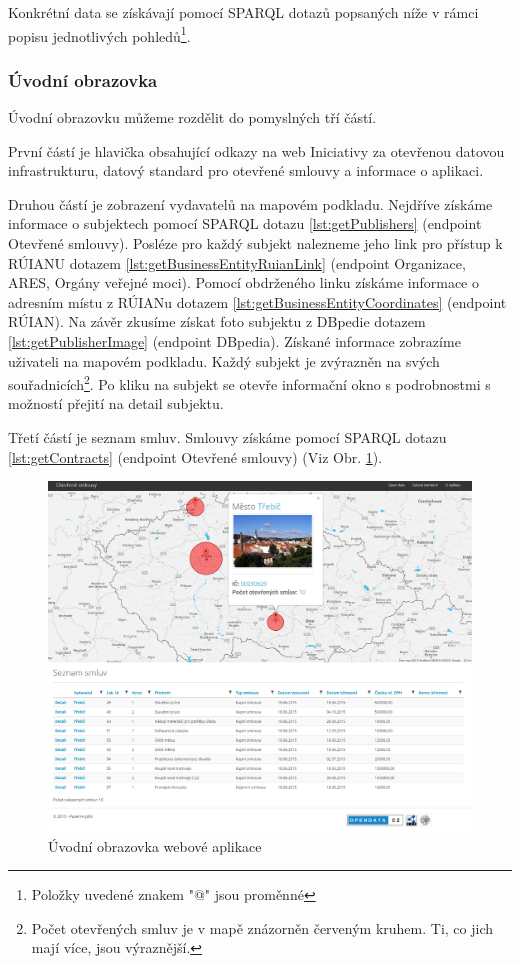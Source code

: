 Konkrétní data se získávají pomocí SPARQL dotazů popsaných níže v rámci popisu jednotlivých pohledů\footnote{Položky uvedené znakem "@" jsou proměnné}.

\subsubsection*{Úvodní obrazovka}

Úvodní obrazovku můžeme rozdělit do pomyslných tří částí. 

První částí je hlavička obsahující odkazy na web Iniciativy za otevřenou datovou infrastrukturu\cite{od}, datový standard pro otevřené smlouvy\cite{metodika} a informace o aplikaci.

Druhou částí je zobrazení vydavatelů na mapovém podkladu. Nejdříve získáme informace o subjektech pomocí SPARQL dotazu \ref{lst:getPublishers} (endpoint Otevřené smlouvy). Posléze pro každý subjekt nalezneme jeho link pro přístup k RÚIANU dotazem \ref{lst:getBusinessEntityRuianLink} (endpoint Organizace, ARES, Orgány veřejné moci). Pomocí obdrženého linku získáme informace o adresním místu z RÚIANu dotazem \ref{lst:getBusinessEntityCoordinates} (endpoint RÚIAN). Na závěr zkusíme získat foto subjektu z DBpedie dotazem \ref{lst:getPublisherImage} (endpoint DBpedia). Získané informace zobrazíme uživateli na mapovém podkladu. Každý subjekt je zvýrazněn na svých souřadnicích\footnote{Počet otevřených smluv je v mapě znázorněn červeným kruhem. Ti, co jich mají více, jsou výraznější.}. Po kliku na subjekt se otevře informační okno s podrobnostmi s možností přejití na detail subjektu.

Třetí částí je seznam smluv. Smlouvy získáme pomocí SPARQL dotazu \ref{lst:getContracts} (endpoint Otevřené smlouvy) (Viz Obr. \ref{obr:mainPage}).\\

\begin{figure}[H]
\centerline{\includegraphics[width=\textwidth]{img/webMainPage.eps}}
\caption{Úvodní obrazovka webové aplikace}
\label{obr:mainPage}
\end{figure}

